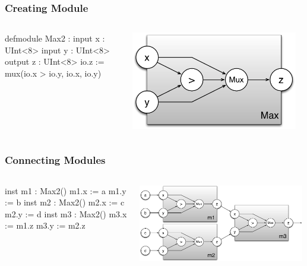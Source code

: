 \documentclass[xcolor=pdflatex,dvipsnames,table]{beamer}
\begin{document}
\begin{frame}[fragile]
\frametitle{Creating Module}

\begin{columns}

{
\begin{stanza}
defmodule Max2 :
  input x : UInt<8>
  input y : UInt<8>
  output z : UInt<8>
  io.z := mux(io.x > io.y, io.x, io.y)
\end{stanza}
}

\begin{center}
\includegraphics[width=0.95\textwidth]{figs/Max2c.pdf} \\
\end{center}
\end{columns}

\end{frame}

\begin{frame}[fragile]
\frametitle{Connecting Modules}

\begin{columns}
\begin{stanza}
inst m1 : Max2()
m1.x := a
m1.y := b
inst m2 : Max2()
m2.x := c
m2.y := d
inst m3 : Max2()
m3.x := m1.z
m3.y := m2.z
\end{stanza}


\begin{center}
\includegraphics[width=0.99\textwidth]{figs/Max4.pdf} \\
\end{center}
\end{columns}

\end{frame}
\end{document}
